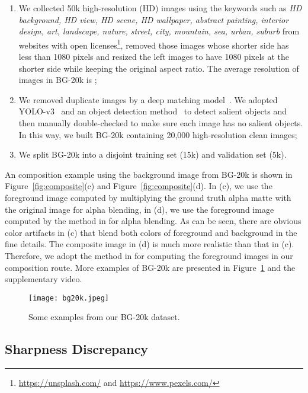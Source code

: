 \documentclass[twocolumn]{svjour3}
\begin{document}
\begin{enumerate}
  \item We collected 50k high-resolution (HD) images using the keywords such as \textit{HD background, HD view, HD scene, HD wallpaper, abstract painting, interior design, art, landscape, nature, street, city, mountain, sea, urban, suburb} from websites with open licenses\footnote{\url{https://unsplash.com/} and \url{https://www.pexels.com/}}, removed those images whose shorter side has less than 1080 pixels and resized the left images to have 1080 pixels at the shorter side while keeping the original aspect ratio. The average resolution of images in BG-20k is ;
  \item We removed duplicate images by a deep matching model~\citep{krizhevsky2012imagenet}. We adopted YOLO-v3~\citep{redmon2018yolov3} and an object detection method~\citep{chen2021recursive} to detect salient objects and then manually double-checked to make sure each image has no salient objects. In this way, we built BG-20k containing 20,000 high-resolution clean images;
  \item We split BG-20k into a disjoint training set (15k) and validation set (5k).
\end{enumerate}

An composition example using the background image from BG-20k is shown in Figure~\ref{fig:composite}(c) and Figure~\ref{fig:composite}(d). In (c), we use the foreground image computed by multiplying the ground truth alpha matte with the original image for alpha blending, in (d), we use the foreground image computed by the method in \citep{levin2007closed} for alpha blending. As can be seen, there are obvious color artifacts in (c) that blend both colors of foreground and background in the fine details. The composite image in (d) is much more realistic than that in (c). Therefore, we adopt the method in \citep{levin2007closed} for computing the foreground images in our composition route. More examples of BG-20k are presented in Figure~\ref{fig:bg20k_examples} and the supplementary video.

\begin{figure}[htbp]
    \centering
    \texttt{[image: bg20k.jpeg]}
     \caption{Some examples from our BG-20k dataset.}
    \label{fig:bg20k_examples}
\end{figure}

\subsection{Sharpness Discrepancy}
\end{document}
